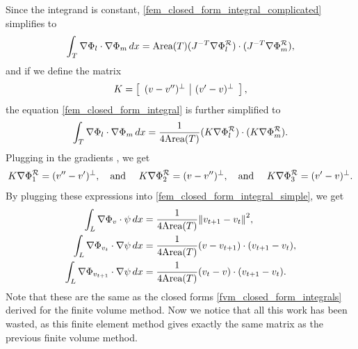 Since the integrand is constant,
\eqref{fem_closed_form_integral_complicated} simplifies to
\begin{equation}\label{fem_closed_form_integral}
    \int_T \nabla\Phi_l \cdot \nabla\Phi_m\,dx
        = \text{Area}(T)(J^{-T}\nabla\Phi^{\mathcal{R}}_l)\cdot(J^{-T}\nabla\Phi^{\mathcal{R}}_m),
\end{equation}
and if we define the matrix
\begin{align*}
    K = \left[\begin{array}{c|c}
        (v - v^{\prime\prime})^\perp & (v^{\prime} - v)^\perp
    \end{array}\right],
\end{align*}
the equation \eqref{fem_closed_form_integral} is further simplified to
\begin{equation}\label{fem_closed_form_integral_simple}
    \int_T \nabla\Phi_l \cdot \nabla\Phi_m\,dx
        = \frac{1}{4\text{Area}(T)} (K\nabla\Phi^{\mathcal{R}}_l)\cdot(K\nabla\Phi^{\mathcal{R}}_m).
\end{equation}
Plugging in the gradients \label{fem_reference_basis_function_gradients}, we get
\begin{equation}
    K\nabla\Phi^{\mathcal{R}}_1 = (v^{\prime\prime} - v^{\prime})^\perp, \text{\quad and \quad}
    K\nabla\Phi^{\mathcal{R}}_2 = (v - v^{\prime\prime})^\perp, \text{\quad and \quad}
    K\nabla\Phi^{\mathcal{R}}_3 = (v^{\prime} - v)^\perp.
\end{equation}
By plugging these expressions into \eqref{fem_closed_form_integral_simple}, we get
\begin{align*}
    \int_L \nabla\Phi_v\cdot\psi\,dx
        &= \frac{1}{4\text{Area}(T)}\norm{v_{t+1} - v_t}^2,\\
    \int_L \nabla\Phi_{v_t}\cdot\nabla\psi\,dx
        &= \frac{1}{4\text{Area}(T)}(v - v_{t+1})\cdot(v_{t+1} - v_t),\\
    \int_L \nabla\Phi_{v_{t+1}}\cdot\nabla\psi\,dx
        &= \frac{1}{4\text{Area}(T)}(v_t - v)\cdot(v_{t+1} - v_t).
\end{align*}
Note that these are the same as the closed forms \eqref{fvm_closed_form_integrals} derived for the finite volume method.
Now we notice that all this work has been wasted, as this finite element method gives
exactly the same matrix as the previous finite volume method.

